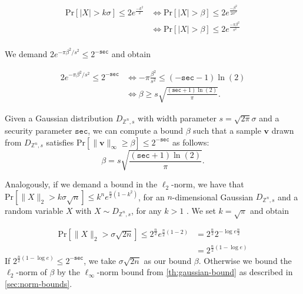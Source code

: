 \begin{align}
    \text{Pr}\left[ |X| > k\sigma \right] \leq 2 e^{\frac{-k^2}{2}} & \iff \text{Pr}\left[ |X| > \beta \right] \leq 2 e^{\frac{-\beta^2}{2\sigma^2}} \\
                                                                    & \iff \text{Pr}\left[ |X| > \beta \right] \leq 2 e^{\frac{-\pi \beta^2}{s^2}}   \\
\end{align}

We demand $2 e^{-\pi \beta^2/s^2} \leq 2^{-\texttt{sec}}$  and obtain

\begin{align*}
    2 e^{-\pi \beta^2/s^2}   \leq 2^{-\texttt{sec}} & \iff       -\pi \frac{\beta^2}{s^2} \leq (-\texttt{sec} - 1)\ln (2)                \\
                                                    & \iff \beta                    \geq s \sqrt{\frac{(\texttt{sec} + 1) \ln(2)}{\pi}}.
\end{align*}

\begin{theorem}\label{th:gaussian-bound}
    Given a Gaussian distribution $D_{\mathbb{Z}^n, s}$ with width parameter $s  = \sqrt{2 \pi} \sigma$ and a security parameter $\texttt{sec}$, we can compute a bound $\beta$ such that a sample $\mathbf{v}$ drawn from $D_{\mathbb{Z}^n, s}$ satisfies $\text{Pr}\left[ \|\mathbf{v}\|_\infty \geq \beta \right] \leq 2^{-\texttt{sec}}$ as follows:
    \begin{equation}
        \beta  = s \sqrt{\frac{(\texttt{sec} + 1) \ln(2)}{\pi}}.
    \end{equation}
\end{theorem}

Analogously, if we demand a bound in the $\ell_2$-norm, we have that $\text{Pr}\left[ \|X\|_2 > k\sigma \sqrt{n} \right] \leq k^n e^{\frac{n}{2}(1-k^2)}$, for an $n$-dimensional Gaussian $D_{\mathbb{Z}^n, s}$ and a random variable $X$ with $X \sim D_{\mathbb{Z}^n, s}$, for any $k>1$ \cite[Lemma~4.4]{Lyu12}. We set $k=\sqrt{\pi}$ and obtain

\begin{align*}
    \text{Pr}\left[ \|X\|_2 > \sigma \sqrt{2n} \right] \leq 2^{\frac{n}{2}} e^{\frac{n}{2}(1-2)} & = 2^{\frac{n}{2}} 2^{-\log e \frac{n}{2}} \\
                                                                                                 & = 2^{\frac{n}{2}(1 -\log e)}
\end{align*}
If $2^{\frac{n}{2}(1 -\log e)} \leq 2^{-\texttt{sec}}$, we take $\sigma \sqrt{2n}$ as our bound $\beta$. Otherwise we bound the $\ell_2$-norm of $\beta$ by the $\ell_\infty$-norm bound from \cref{th:gaussian-bound} as described in \cref{sec:norm-bounds}.

